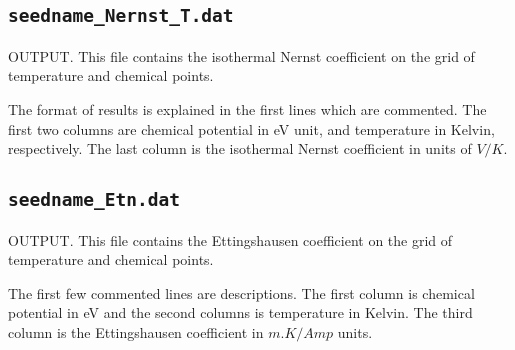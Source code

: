 \subsection{{\tt seedname\_Nernst_T.dat}}
OUTPUT. This file contains the isothermal Nernst coefficient on the grid of temperature and chemical points. 

The format of results is explained in the first lines which are commented. The first two columns are chemical potential in eV unit, and temperature in Kelvin, respectively. The last column is the isothermal Nernst coefficient in units of $V/K$. 

\subsection{{\tt seedname\_Etn.dat}}
OUTPUT. This file contains the Ettingshausen coefficient on the grid of temperature and chemical points. 

The first few commented lines are descriptions. The first column is chemical potential in eV and the second columns is temperature in Kelvin. The third column is the Ettingshausen coefficient in $m.K/Amp$ units. 
